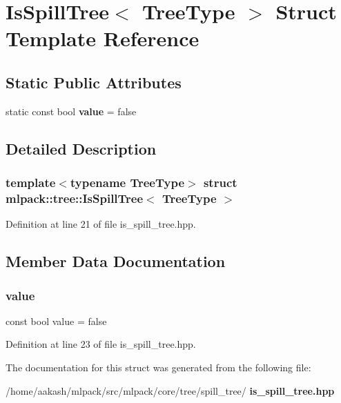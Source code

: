 \section{Is\+Spill\+Tree$<$ Tree\+Type $>$ Struct Template Reference}
\label{structmlpack_1_1tree_1_1IsSpillTree}
\subsection*{Static Public Attributes}
\begin{DoxyCompactItemize}
\item 
static const bool \textbf{ value} = false
\end{DoxyCompactItemize}


\subsection{Detailed Description}
\subsubsection*{template$<$typename Tree\+Type$>$\newline
struct mlpack\+::tree\+::\+Is\+Spill\+Tree$<$ Tree\+Type $>$}



Definition at line 21 of file is\+\_\+spill\+\_\+tree.\+hpp.



\subsection{Member Data Documentation}
\mbox{\label{structmlpack_1_1tree_1_1IsSpillTree_a11ddd051208250c32dc4985abcafa86d}} 
\subsubsection{value}
{\footnotesize\ttfamily const bool value = false\hspace{0.3cm}{\ttfamily [static]}}



Definition at line 23 of file is\+\_\+spill\+\_\+tree.\+hpp.



The documentation for this struct was generated from the following file\+:\begin{DoxyCompactItemize}
\item 
/home/aakash/mlpack/src/mlpack/core/tree/spill\+\_\+tree/\textbf{ is\+\_\+spill\+\_\+tree.\+hpp}\end{DoxyCompactItemize}
